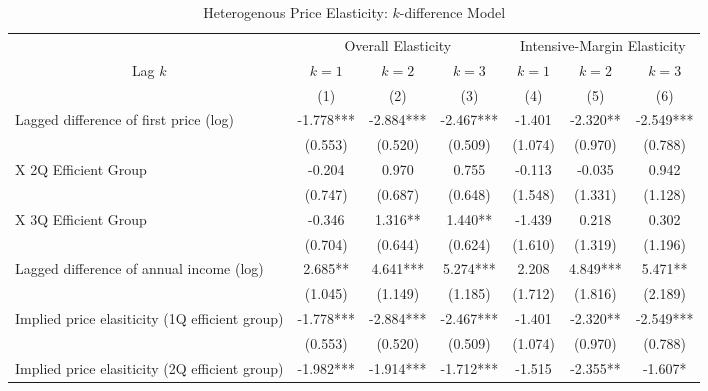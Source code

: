 \documentclass[ review  , 3p ]{elsarticle}
\begin{document}
  \begin{table}
  
  \caption{\label{tab:kableHeterokDiffElasticity}Heterogenous Price Elasticity: $k$-difference Model}
  \centering
  \fontsize{8}{10}\selectfont
  \begin{threeparttable}
  \begin{tabular}[t]{lcccccc}
  \toprule
  \multicolumn{1}{c}{ } & \multicolumn{3}{c}{Overall Elasticity} & \multicolumn{3}{c}{Intensive-Margin Elasticity} \\
  \cmidrule(l{3pt}r{3pt}){2-4} \cmidrule(l{3pt}r{3pt}){5-7}
  \multicolumn{1}{c}{Lag $k$} & \multicolumn{1}{c}{$k = 1$} & \multicolumn{1}{c}{$k = 2$} & \multicolumn{1}{c}{$k = 3$} & \multicolumn{1}{c}{$k = 1$} & \multicolumn{1}{c}{$k = 2$} & \multicolumn{1}{c}{$k = 3$} \\
  \cmidrule(l{3pt}r{3pt}){1-1} \cmidrule(l{3pt}r{3pt}){2-2} \cmidrule(l{3pt}r{3pt}){3-3} \cmidrule(l{3pt}r{3pt}){4-4} \cmidrule(l{3pt}r{3pt}){5-5} \cmidrule(l{3pt}r{3pt}){6-6} \cmidrule(l{3pt}r{3pt}){7-7}
   & (1) & (2) & (3) & (4) & (5) & (6)\\
  \midrule
  Lagged difference of first price (log) & -1.778*** & -2.884*** & -2.467*** & -1.401 & -2.320** & -2.549***\\
   & (0.553) & (0.520) & (0.509) & (1.074) & (0.970) & \vphantom{1} (0.788)\\
  \hspace{1em}X 2Q Efficient Group & -0.204 & 0.970 & 0.755 & -0.113 & -0.035 & 0.942\\
   & (0.747) & (0.687) & (0.648) & (1.548) & (1.331) & (1.128)\\
  \hspace{1em}X 3Q Efficient Group & -0.346 & 1.316** & 1.440** & -1.439 & 0.218 & 0.302\\
   & (0.704) & (0.644) & (0.624) & (1.610) & (1.319) & (1.196)\\
  Lagged difference of annual income (log) & 2.685** & 4.641*** & 5.274*** & 2.208 & 4.849*** & 5.471**\\
   & (1.045) & (1.149) & (1.185) & (1.712) & (1.816) & \vphantom{1} (2.189)\\
  Implied price elasiticity (1Q efficient group) & -1.778*** & -2.884*** & -2.467*** & -1.401 & -2.320** & -2.549***\\
   & (0.553) & (0.520) & (0.509) & (1.074) & (0.970) & (0.788)\\
  Implied price elasiticity (2Q efficient group) & -1.982*** & -1.914*** & -1.712*** & -1.515 & -2.355** & -1.607*\\

\end{tabular}
\end{threeparttable}
\end{table}
\end{document}
